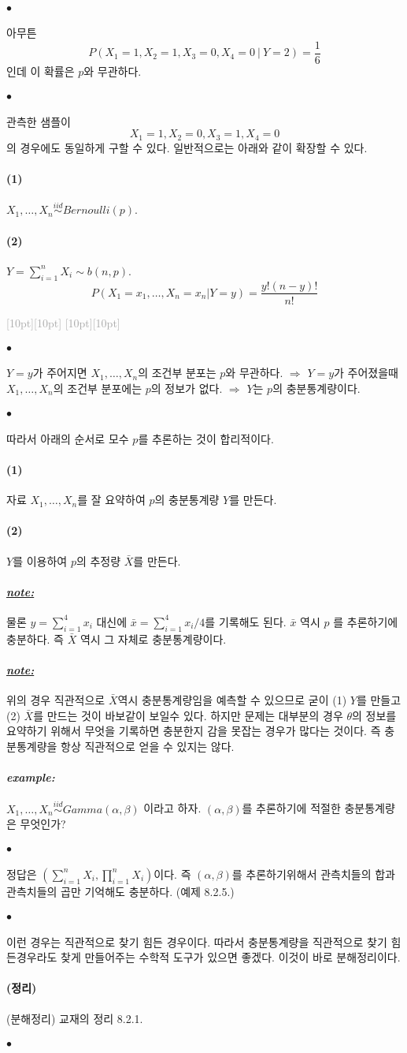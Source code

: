 \documentclass[12pt,oneside,english]{book}
\newcommand{\rdash}{\noindent \textcolor{darkgray}{ \raisebox{-1.9pt}[10pt][10pt]{\leafright} \hrulefill \raisebox{-1.9pt}[10pt][10pt]{\leafright \decofourleft \decothreeleft  \aldineright \decotwo \floweroneleft \decoone}}}
\def\ck{\paragraph{\Large$\bullet$}\Large}
\def\thm{\paragraph{\Large(정리)}\Large}
\def\note{\paragraph{\Large\textit{\underline{note:}}}\Large}
\def\ex{\paragraph{\Large\textit{example:}}\Large}
\def\one{\paragraph{\Large(1)}\Large}
\def\two{\paragraph{\Large(2)}\Large}
\begin{document}
\ck 아무튼 
\[
P(X_1=1,X_2=1,X_3=0,X_4=0 ~ |~  Y=2)=\frac{1}{6}
\]
인데 이 확률은 $p$와 무관하다. 

\ck 관측한 샘플이 
\[
X_1=1,X_2=0,X_3=1,X_4=0
\]
의 경우에도 동일하게 구할 수 있다. 일반적으로는 아래와 같이 확장할 수 있다. 
\one $X_1,\dots, X_n \overset{iid}{\sim} Bernoulli(p)$.
\two $Y=\sum_{i=1}^{n}X_i \sim b(n,p)$. 
\[
P(X_1=x_1,\dots,X_n=x_n | Y=y)=\frac{y!(n-y)!}{n!}
\]

\rdash 

\ck $Y=y$가 주어지면 $X_1,\dots,X_n$의 조건부 분포는 $p$와 무관하다. $\Longrightarrow$ $Y=y$가 주어졌을때 $X_1,\dots ,X_n$의 조건부 분포에는 $p$의 정보가 없다. $\Longrightarrow$ $Y$는 $p$의 충분통계량이다. 

\ck 따라서 아래의 순서로 모수 $p$를 추론하는 것이 합리적이다. 
\one 자료 $X_1,\dots,X_n$를 잘 요약하여 $p$의 충분통계량 $Y$를 만든다. 
\two $Y$를 이용하여 $p$의 추정량 $\bar{X}$를 만든다. 


\note 물론 $y=\sum_{i=1}^{4}x_i$ 대신에 $\bar{x}=\sum_{i=1}^{4}x_i/4$를 기록해도 된다. $\bar{x}$ 역시 $p$ 를 추론하기에 충분하다. 즉 $\bar{X}$ 역시 그 자체로 충분통계량이다. 

\note 위의 경우 직관적으로 $\bar{X}$역시 충분통계량임을 예측할 수 있으므로 굳이 (1) $Y$를 만들고 (2) $\bar{X}$를 만드는 것이 바보같이 보일수 있다. 하지만 문제는 대부분의 경우 $\theta$의 정보를 요약하기 위해서 무엇을 기록하면 충분한지 감을 못잡는 경우가 많다는 것이다. 즉 충분통계량을 항상 직관적으로 얻을 수 있지는 않다. 

\ex $X_1,\dots,X_n \overset{iid}{\sim} Gamma(\alpha,\beta)$ 이라고 하자. $(\alpha,\beta)$를 추론하기에 적절한 충분통계량은 무엇인가? 

\ck 정답은 $(\sum_{i=1}^{n} X_i,\prod_{i=1}^{n} X_i)$이다. 즉 $(\alpha,\beta)$를 추론하기위해서 관측치들의 합과 관측치들의 곱만 기억해도 충분하다. (예제 8.2.5.)

\ck 이런 경우는 직관적으로 찾기 힘든 경우이다. 따라서 충분통계량을 직관적으로 찾기 힘든경우라도 찾게 만들어주는 수학적 도구가 있으면 좋겠다. 이것이 바로 분해정리이다. 

\thm (분해정리) 교재의 정리 8.2.1. 

\ck 
\end{document}
